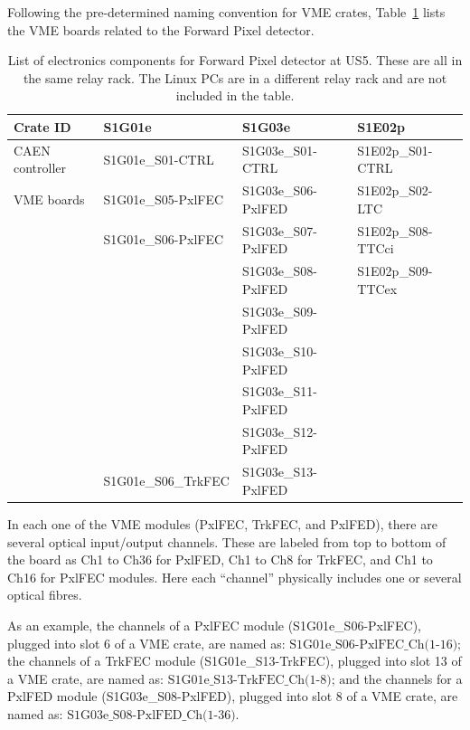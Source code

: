 \documentclass{cmspaper}
\begin{document}
Following the pre-determined naming convention for VME crates, 
Table~\ref{table:us5:vme} lists the VME boards related to
the Forward Pixel detector. 

  \begin{table}[htb]
    \caption{List of electronics components for Forward Pixel detector at US5.
These are all in the same relay rack. The Linux PCs are in a different relay rack 
and are not included in the table.}
    \label{table:us5:vme}
    \begin{center}
      \begin{tabular}{l|lll} \hline
Crate ID&         S1G01e&                 S1G03e&                 S1E02p\\\hline
CAEN controller& S1G01e\_S01-CTRL&  S1G03e\_S01-CTRL&  S1E02p\_S01-CTRL\\
VME boards&         S1G01e\_S05-PxlFEC&  S1G03e\_S06-PxlFED&  S1E02p\_S02-LTC\\
&                 S1G01e\_S06-PxlFEC&  S1G03e\_S07-PxlFED&  S1E02p\_S08-TTCci\\
&                 &                  S1G03e\_S08-PxlFED&  S1E02p\_S09-TTCex\\
&                 &                  S1G03e\_S09-PxlFED&  \\
&                 &                  S1G03e\_S10-PxlFED&  \\
&                 &                  S1G03e\_S11-PxlFED&  \\
&                 &                  S1G03e\_S12-PxlFED&  \\
&                 S1G01e\_S06\_TrkFEC&  S1G03e\_S13-PxlFED&  \\ \hline
      \end{tabular}
    \end{center}
  \end{table}

In each one of the VME modules (PxlFEC, TrkFEC, and PxlFED), there are 
several optical input/output channels. These are labeled from top to 
bottom of the board as Ch1 to Ch36 for PxlFED, Ch1 to Ch8 for 
TrkFEC, and Ch1 to Ch16 for PxlFEC modules. 
Here each ``channel'' physically includes 
one or several optical fibres.  

As an example, the channels of a PxlFEC module (S1G01e\_S06-PxlFEC), 
plugged into slot 6 of a VME crate, are named as:
$\mbox{S1G01e\_S06-PxlFEC\_Ch(1-16);}$
the channels of a TrkFEC module (S1G01e\_S13-TrkFEC),
plugged into slot 13 of a VME crate, are named as:
$\mbox{S1G01e\_S13-TrkFEC\_Ch(1-8); and}$
the channels for a PxlFED module (S1G03e\_S08-PxlFED),
plugged into slot 8 of a VME crate, are named as:
$\mbox{S1G03e\_S08-PxlFED\_Ch(1-36).}$
\end{document}
